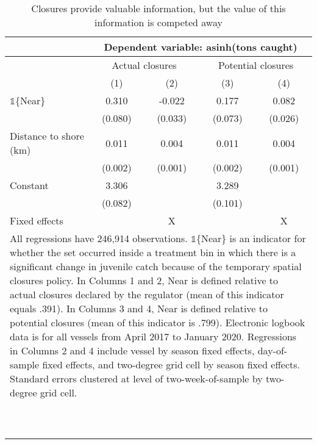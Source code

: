 \begin{table}[tb]
\centering
\caption{Closures provide valuable information, but the value of this information is competed away} 
\label{information_valuable}
\begin{tabular}{lcccc}
   \toprule & \multicolumn{4}{c}{Dependent variable: asinh(tons caught)} \\  \midrule & \multicolumn{2}{c}{Actual closures} & \multicolumn{2}{c}{Potential closures} \\ & (1) & (2) & (3) & (4) \\ 
   \midrule $\mathbb{1}$\{Near\} & 0.310 & -0.022 & 0.177 & 0.082 \\ 
   & (0.080) & (0.033) & (0.073) & (0.026) \\ 
  Distance to shore (km) & 0.011 & 0.004 & 0.011 & 0.004 \\ 
   & (0.002) & (0.001) & (0.002) & (0.001) \\ 
  Constant & 3.306 &  & 3.289 &  \\ 
   & (0.082) &  & (0.101) &  \\ 
   \midrule Fixed effects & & X & & X\\  \bottomrule \multicolumn{5}{l}{\multirow{2}{12cm}{All regressions have 246,914 observations. $\mathbb{1}$\{Near\} is an indicator for whether the set occurred inside a treatment bin in which there is a significant change in juvenile catch because of the temporary spatial closures policy. In Columns 1 and 2, Near is defined relative to actual closures declared by the regulator (mean of this indicator equals .391). In Columns 3 and 4, Near is defined relative to potential closures (mean of this indicator is .799). Electronic logbook data is for all vessels from April 2017 to January 2020. Regressions in Columns 2 and 4 include vessel by season fixed effects, day-of-sample fixed effects, and two-degree grid cell by season fixed effects. Standard errors clustered at level of two-week-of-sample by two-degree grid cell.}} \\\\\\\\\\\\\\\\\\\\\\\\ \end{tabular}
\end{table}
